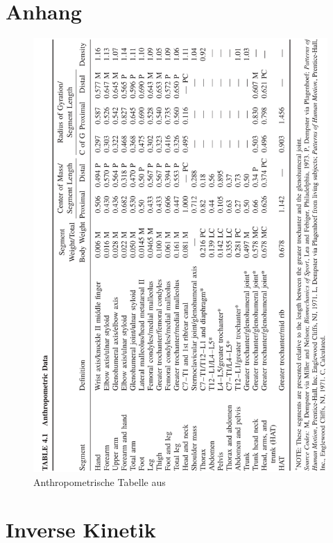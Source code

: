 \appendix                %

\section{Anhang}%

\begin{figure}[h!]
	\centering
	\includegraphics[width=.9\linewidth]{bilder/anhang/anthrop_Tabelle}
	\caption[Anthropometrische Tabelle]{Anthropometrische Tabelle aus \textcite{winter2009biomechanics}}
	\label{fig:antrop_Tabelle}
\end{figure}

\section*{Inverse Kinetik}
